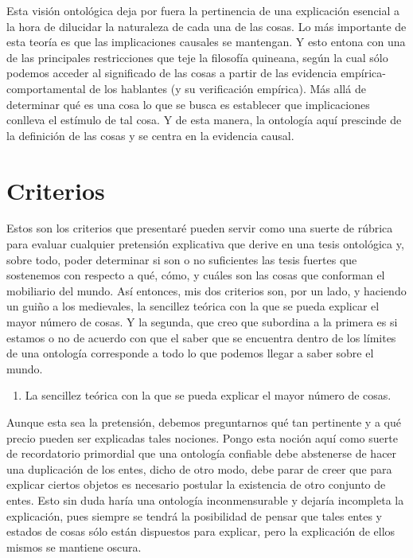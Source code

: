 \documentclass[]{book}
\begin{document}
\begin{refsection}
Esta visión ontológica deja por fuera la pertinencia de una explicación
esencial a la hora de dilucidar la naturaleza de cada una de las cosas.
Lo más importante de esta teoría es que las implicaciones causales se
mantengan. Y esto entona con una de las principales restricciones que
teje la filosofía quineana, según la cual sólo podemos acceder al
significado de las cosas a partir de las evidencia
empírica-comportamental de los hablantes (y su verificación empírica).
Más allá de determinar qué es una cosa lo que se busca es establecer que
implicaciones conlleva el estímulo de tal cosa. Y de esta manera, la
ontología aquí prescinde de la definición de las cosas y se centra en la
evidencia causal.

\section*{Criterios}

Estos son los criterios que presentaré pueden servir como una suerte de
rúbrica para evaluar cualquier pretensión explicativa que derive en una
tesis ontológica y, sobre todo, poder determinar si son o no suficientes
las tesis fuertes que sostenemos con respecto a qué, cómo, y cuáles son
las cosas que conforman el mobiliario del mundo. Así entonces, mis dos
criterios son, por un lado, y haciendo un guiño a los medievales, la
sencillez teórica con la que se pueda explicar el mayor número de cosas.
Y la segunda, que creo que subordina a la primera es si estamos o no de
acuerdo con que el saber que se encuentra dentro de los límites de una
ontología corresponde a todo lo que podemos llegar a saber sobre el
mundo.

\begin{enumerate}
\def\labelenumi{\arabic{enumi}.}
\item
  La sencillez teórica con la que se pueda explicar el mayor número de
  cosas.
\end{enumerate}

Aunque esta sea la pretensión, debemos preguntarnos qué tan pertinente y
a qué precio pueden ser explicadas tales nociones. Pongo esta noción
aquí como suerte de recordatorio primordial que una ontología confiable
debe abstenerse de hacer una duplicación de los entes, dicho de otro
modo, debe parar de creer que para explicar ciertos objetos es necesario
postular la existencia de otro conjunto de entes. Esto sin duda haría
una ontología inconmensurable y dejaría incompleta la explicación, pues
siempre se tendrá la posibilidad de pensar que tales entes y estados de
cosas sólo están dispuestos para explicar, pero la explicación de ellos
mismos se mantiene oscura.


\end{refsection}
\end{document}
